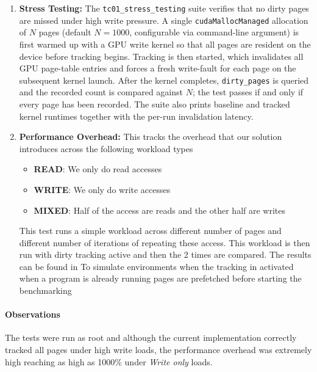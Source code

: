 \begin{enumerate}
      \item \textbf{Stress Testing:}
      The \texttt{tc01\_stress\_testing} suite verifies that no dirty pages are
      missed under high write pressure.
      A single \texttt{cudaMallocManaged} allocation of $N$ pages (default
      $N = 1000$, configurable via command-line argument) is first warmed up with
      a GPU write kernel so that all pages are resident on the device before
      tracking begins.
      Tracking is then started, which invalidates all GPU page-table entries and
      forces a fresh write-fault for each page on the subsequent kernel launch.
      After the kernel completes, \texttt{dirty\_pages} is queried and the
      recorded count is compared against $N$; the test passes if and only if
      every page has been recorded.
      The suite also prints baseline and tracked kernel runtimes together with
      the per-run invalidation latency.


      \item \textbf{Performance Overhead:}
      This tracks the overhead that our solution introduces across the following workload types
      \begin{itemize}
            \item \textbf{READ}: We only do read accesses
            \item \textbf{WRITE}: We only do write accesses
            \item \textbf{MIXED}: Half of the access are reads and the other half are writes
      \end{itemize}
      This test runs a simple workload across different number of pages and different number of 
      iterations of repeating these access.
      This workload is then run with dirty tracking active and then the 2 times are compared. 
      The results can be found in 
      To simulate environments when the tracking in activated when a program is already running
      pages are prefetched before starting the benchmarking
\end{enumerate}

\paragraph{Observations}
The tests were run as root and although the current implementation correctly tracked
all pages under high write loads, the performance overhead was extremely high 
reaching as high as 1000\% under \textit{Write only} loads.


